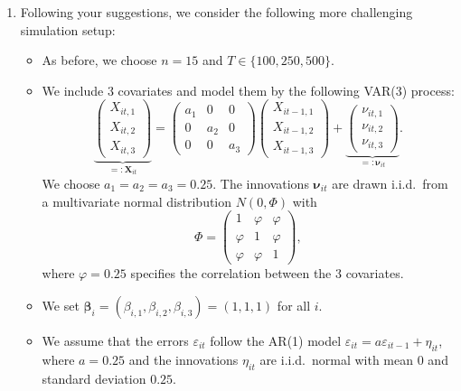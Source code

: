 \documentclass[a4paper,12pt]{article}
\begin{document}
\begin{enumerate}[label=\arabic*.,leftmargin=0.6cm]
\begin{enumerate}[label=(\roman*),leftmargin=0.75cm,topsep=0pt]
\item Following your suggestions, we consider the following more challenging simulation setup:

\begin{itemize}[leftmargin=0.45cm,itemsep=0pt,topsep=0pt]

\item As before, we choose $n=15$ and $T \in \{100,250,500\}$. 
  
\item We include $3$ covariates and model them by the following VAR(3) process:
\[ \underbrace{\begin{pmatrix} X_{it,1} \\ X_{it,2} \\ X_{it,3} \end{pmatrix}}_{=: \boldsymbol{X}_{it}} = \begin{pmatrix} a_1 & 0 & 0 \\ 0 & a_2 & 0 \\ 0 & 0 & a_3 \end{pmatrix} \begin{pmatrix} X_{it-1,1} \\ X_{it-1,2} \\ X_{it-1,3} \end{pmatrix} + \underbrace{\begin{pmatrix} \nu_{it,1} \\ \nu_{it,2} \\ \nu_{it,3} \end{pmatrix}}_{=: \boldsymbol{\nu}_{it}}. \] 
We choose $a_1 = a_2 = a_3 = 0.25$. The innovations $\boldsymbol{\nu}_{it}$ are drawn i.i.d.\ from a multivariate normal distribution $N(0,\Phi)$ with
\[ \Phi = \begin{pmatrix} 1 & \varphi & \varphi \\ \varphi & 1 & \varphi \\ \varphi & \varphi & 1 \end{pmatrix}, \]
where $\varphi = 0.25$ specifies the correlation between the 3 covariates. 

\item We set $\boldsymbol{\beta}_i = (\beta_{i,1},\beta_{i,2},\beta_{i,3}) = (1,1,1)$ for all $i$.

\item We assume that the errors $\varepsilon_{it}$ follow the AR(1) model $\varepsilon_{it} = a \varepsilon_{it-1} + \eta_{it}$, where $a=0.25$ and the innovations $\eta_{it}$ are i.i.d.\ normal with mean $0$ and standard deviation $0.25$.


\end{itemize}
\end{enumerate}
\end{enumerate}
\end{document}
